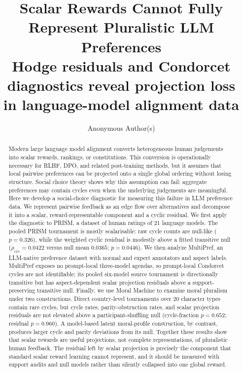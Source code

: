 \documentclass[10pt]{article}
\title{\textbf{Scalar Rewards Cannot Fully Represent Pluralistic LLM Preferences
}\\[0.3em]
\large Hodge residuals and Condorcet diagnostics reveal projection loss\\ in language-model alignment data}
\author{Anonymous Author(s)}
\date{}
\theoremstyle{definition}
\theoremstyle{remark}
\begin{document}
\maketitle

\vspace{-2em}

\begin{abstract}
\noindent
Modern large language model alignment converts heterogeneous human judgements into scalar rewards, rankings, or constitutions. This conversion is operationally necessary for RLHF, DPO, and related post-training methods, but it assumes that local pairwise preferences can be projected onto a single global ordering without losing structure. Social choice theory shows why this assumption can fail: aggregate preferences may contain cycles even when the underlying judgements are meaningful. Here we develop a social-choice diagnostic for measuring this failure in LLM preference data. We represent pairwise feedback as an edge flow over alternatives and decompose it into a scalar, reward-representable component and a cyclic residual. We first apply the diagnostic to PRISM, a dataset of human ratings of 21 language models. The pooled PRISM tournament is mostly scalarisable: raw cycle counts are null-like ($p=0.326$), while the weighted cyclic residual is modestly above a fitted transitive null ($\rho_{\mathrm{cyc}}=0.0422$ versus null mean $0.0365$; $p=0.0446$). We then analyze MultiPref, an LLM-native preference dataset with normal and expert annotators and aspect labels. MultiPref exposes no prompt-local three-model agendas, so prompt-local Condorcet cycles are not identifiable; its pooled six-model source tournament is directionally transitive but has aspect-dependent scalar projection residuals above a support-preserving transitive null. Finally, we use Moral Machine to examine moral pluralism under two constructions. Direct country-level tournaments over 20 character types contain rare cycles, but cycle rates, parity-obstruction rates, and scalar projection residuals are not elevated above a participant-shuffling null (cycle-fraction $p=0.652$; residual $p=0.960$). A model-based latent moral-profile construction, by contrast, produces larger cycle and parity deviations from its null. Together these results show that scalar rewards are useful projections, not complete representations, of pluralistic human feedback. The residual left by scalar projection is precisely the component that standard scalar reward learning cannot represent, and it should be measured with support audits and null models rather than silently collapsed into one global reward.
\end{abstract}
\end{document}
